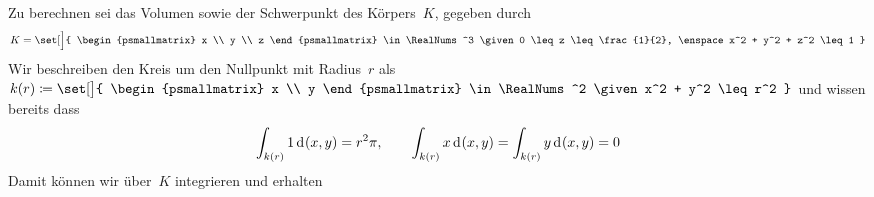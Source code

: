 \documentclass[../full]{subfiles}
\begin{document}

    Zu berechnen sei das Volumen sowie der Schwerpunkt des K\"orpers~\( K \),
    gegeben durch
    \begin{equation*}
        K = \set[\Big]{
            \begin{psmallmatrix} x \\ y \\ z \end{psmallmatrix} \in \RealNums^3
            \given 0 \leq z \leq \frac{1}{2}, \enspace
                x^2 + y^2 + z^2 \leq 1
        }
    \end{equation*}
    Wir beschreiben den Kreis um den Nullpunkt mit Radius~\( r \) als~\(
        k \paren{r} \coloneqq \set[\big]{
            \begin{psmallmatrix} x \\ y \end{psmallmatrix} \in \RealNums^2
            \given x^2 + y^2 \leq r^2
        }
    \) und wissen bereits dass
    \begin{equation*}
        \int_{k \paren{r}} 1 \dx[\paren{x, y}] = r^2 \pi,
        \qquad
        \int_{k \paren{r}} x \dx[\paren{x, y}]
        = \int_{k \paren{r}} y \dx[\paren{x, y}] = 0
    \end{equation*}
    Damit k\"onnen wir \"uber~\( K \) integrieren und erhalten
\end{document}
